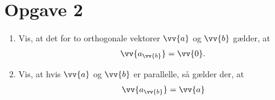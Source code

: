 \section*{Opgave 2}

\begin{enumerate}[label=\roman*)]
\item Vis, at det for to orthogonale vektorer $\vv{a}$ og $\vv{b}$ gælder, at 
\begin{align*}
\vv{a_{\vv{b}}} = \vv{0}.
\end{align*}
\item Vis, at hvis $\vv{a}$ og $\vv{b}$ er parallelle, så gælder der, at
\begin{align*}
\vv{a_{\vv{b}}} = \vv{a}
\end{align*}
\end{enumerate}
